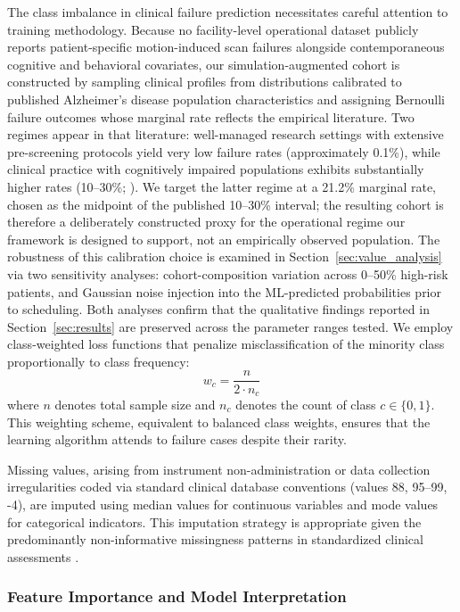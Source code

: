 \documentclass[11pt,a4paper]{article}
\begin{document}
The class imbalance in clinical failure prediction necessitates careful attention to training methodology. Because no facility-level operational dataset publicly reports patient-specific motion-induced scan failures alongside contemporaneous cognitive and behavioral covariates, our simulation-augmented cohort is constructed by sampling clinical profiles from distributions calibrated to published Alzheimer's disease population characteristics and assigning Bernoulli failure outcomes whose marginal rate reflects the empirical literature. Two regimes appear in that literature: well-managed research settings with extensive pre-screening protocols yield very low failure rates (approximately 0.1\%), while clinical practice with cognitively impaired populations exhibits substantially higher rates (10--30\%; \citealp{porembka2025disparities}). We target the latter regime at a 21.2\% marginal rate, chosen as the midpoint of the published 10--30\% interval; the resulting cohort is therefore a deliberately constructed proxy for the operational regime our framework is designed to support, not an empirically observed population. The robustness of this calibration choice is examined in Section~\ref{sec:value_analysis} via two sensitivity analyses: cohort-composition variation across 0--50\% high-risk patients, and Gaussian noise injection into the ML-predicted probabilities prior to scheduling. Both analyses confirm that the qualitative findings reported in Section~\ref{sec:results} are preserved across the parameter ranges tested. We employ class-weighted loss functions that penalize misclassification of the minority class proportionally to class frequency:
\begin{equation}
w_c = \frac{n}{2 \cdot n_c}
\end{equation}
where $n$ denotes total sample size and $n_c$ denotes the count of class $c \in \{0, 1\}$. This weighting scheme, equivalent to balanced class weights, ensures that the learning algorithm attends to failure cases despite their rarity.

Missing values, arising from instrument non-administration or data collection irregularities coded via standard clinical database conventions (values 88, 95--99, -4), are imputed using median values for continuous variables and mode values for categorical indicators. This imputation strategy is appropriate given the predominantly non-informative missingness patterns in standardized clinical assessments \citep{sterne2009multiple}.

\subsubsection{Feature Importance and Model Interpretation}
\end{document}

